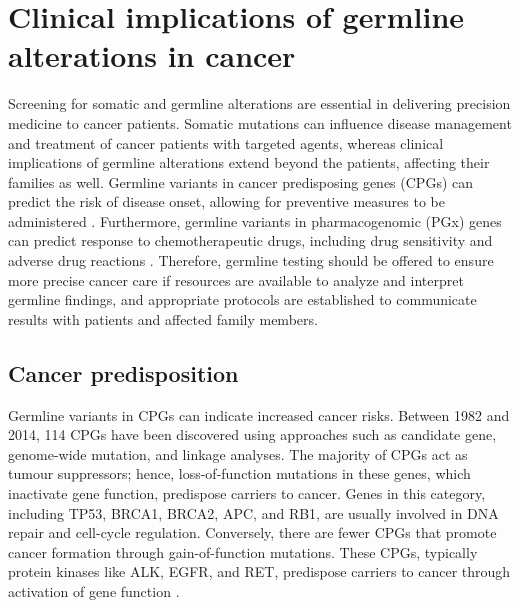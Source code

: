 

\section{Clinical implications of germline alterations in cancer}
\label{sec:Clinicalimplicationsofgermlinealterationsincancer}

Screening for somatic and germline alterations are essential in delivering precision medicine to cancer patients. Somatic mutations can influence disease management and treatment of cancer patients with targeted agents, whereas clinical implications of germline alterations extend beyond the patients, affecting their families as well. Germline variants in cancer predisposing genes (\acs{CPG}s) can predict the risk of disease onset, allowing for preventive measures to be administered \cite{Rahman2014}. Furthermore, germline variants in pharmacogenomic (\acs{PGx}) genes can predict response to chemotherapeutic drugs, including drug sensitivity and adverse drug reactions \cite{Panczyk2014, Mohelnikova-Duchonova2014}. Therefore, germline testing should be offered to ensure more precise cancer care if resources are available to analyze and interpret germline findings, and appropriate protocols are established to communicate results with patients and affected family members.

\subsection{Cancer predisposition}

Germline variants in CPGs can indicate increased cancer risks. Between 1982 and 2014, 114 CPGs have been discovered using approaches such as candidate gene, genome-wide mutation, and linkage analyses. The majority of CPGs act as tumour suppressors; hence, loss-of-function mutations in these genes, which inactivate gene function, predispose carriers to cancer. Genes in this category, including \acs{TP53}, \acs{BRCA1}, \acs{BRCA2}, \acs{APC}, and \acs{RB1}, are usually involved in DNA repair and cell-cycle regulation. Conversely, there are fewer CPGs that promote cancer formation through gain-of-function mutations. These CPGs, typically protein kinases like \acs{ALK}, \acs{EGFR}, and \acs{RET}, predispose carriers to cancer through activation of gene function \cite{Rahman2014}.

